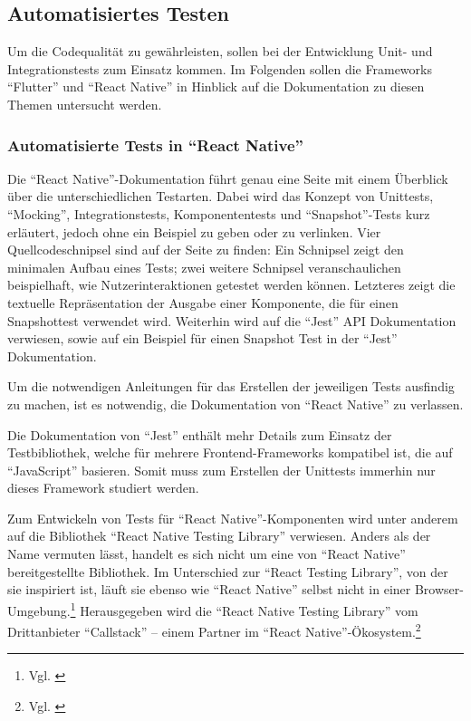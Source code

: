  


\subsection{Automatisiertes Testen}

Um die Codequalität zu gewährleisten,
sollen bei der Entwicklung Unit- und Integrationstests zum Einsatz kommen.
Im Folgenden sollen die Frameworks \enquote{Flutter} und \enquote{React Native} in Hinblick auf die Dokumentation zu diesen Themen untersucht werden. 

\subsubsection{Automatisierte Tests in \enquote{React Native}} Die \enquote{React Native}-Dokumentation führt genau eine Seite mit einem Überblick über die unterschiedlichen Testarten.
Dabei wird das Konzept von Unittests, \enquote{Mocking}, Integrationstests, Komponententests und \enquote{Snapshot}-Tests kurz erläutert, jedoch ohne ein Beispiel zu geben oder zu verlinken.
Vier Quellcodeschnipsel sind auf der Seite zu finden: Ein Schnipsel zeigt den minimalen Aufbau eines Tests; zwei weitere Schnipsel veranschaulichen beispielhaft, wie Nutzerinteraktionen getestet werden können.
Letzteres zeigt die textuelle Repräsentation der Ausgabe einer Komponente, die für einen Snapshottest verwendet wird.
Weiterhin wird auf die \enquote{Jest} API Dokumentation verwiesen, sowie auf ein Beispiel für einen Snapshot Test in der \enquote{Jest} Dokumentation.

Um die notwendigen Anleitungen für das Erstellen der jeweiligen Tests ausfindig zu machen, ist es notwendig, die Dokumentation von \enquote{React Native} zu verlassen.

Die Dokumentation von \enquote{Jest} enthält mehr Details zum Einsatz der Testbibliothek, welche für mehrere Frontend-Frameworks kompatibel ist,
die auf \enquote{JavaScript} basieren.
Somit muss zum Erstellen der Unittests immerhin nur dieses Framework studiert werden.

Zum Entwickeln von Tests für \enquote{React Native}-Komponenten wird unter anderem auf die Bibliothek \enquote{React Native Testing Library} verwiesen.
Anders als der Name vermuten lässt, handelt es sich nicht um eine von \enquote{React Native} bereitgestellte Bibliothek.
Im Unterschied zur \enquote{React Testing Library}, von der sie inspiriert ist, läuft sie  ebenso  wie \enquote{React Native} selbst nicht in einer Browser-Umgebung.\footnote{Vgl. \cite{NativeTestingLibraryIntroduction}}
Herausgegeben wird die \enquote{React Native Testing Library} vom Drittanbieter \enquote{Callstack} -- einem Partner im \enquote{React Native}-Ökosystem.\footnote{Vgl. \cite{TheReactNativeEcosystem}}


